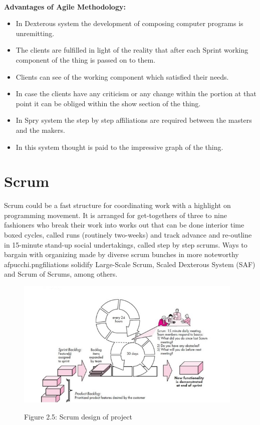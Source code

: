 \documentclass{book}
\begin{document}
    	\paragraph{}
    	\textbf{Advantages of Agile Methodology:}
    	\begin{itemize}
    		\item In Dexterous system the development of composing computer programs is unremitting.
    		\item The clients are fulfilled in light of the reality that after each Sprint working
    		component of the thing is passed on to them.
    		\item Clients can see of the working component which satisfied their needs.
    		\item In case the clients have any criticism or any change within the portion at that
    		point it can be obliged within the show section of the thing.
    		\item In Spry system the step by step affiliations are required between the masters
    		and the makers.
    		\item In this system thought is paid to the impressive graph of the thing.
    	\end{itemize}
    	
    	
    	
    	\section{Scrum}
    	Scrum could be a fast structure for coordinating work with a highlight on programming movement. It is arranged for get-togethers of three to nine fashioners who break their work into works out that can be done interior time boxed cycles, called runs (routinely two-weeks) and track advance and re-outline in 15-minute stand-up social undertakings, called step by step scrums. Ways to bargain with organizing made by diverse scrum bunches in more noteworthy afpucchi.pngfiliations solidify Large-Scale Scrum, Scaled Dexterous System (SAF) and Scrum of Scrums, among others.
    	
    	
    	\begin{figure}
    		\includegraphics[]{images/animesh_chotu.png}
    		
    		\begin{center}
    			Figure 2.5: Scrum design of project
    		\end{center}
    	\end{figure}
\end{document}
